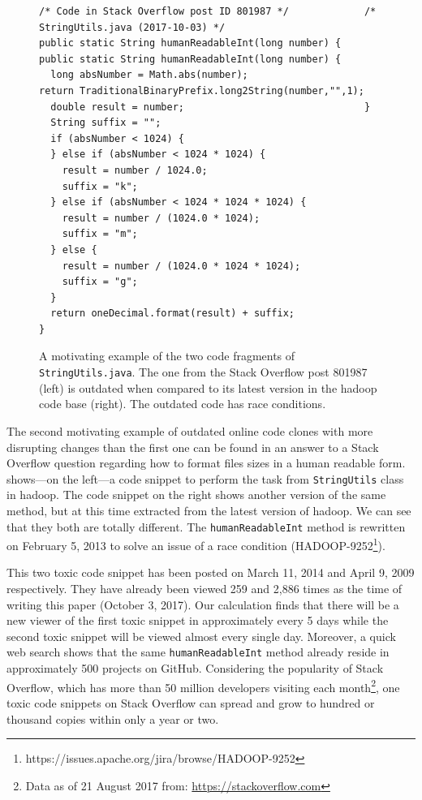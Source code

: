 \documentclass[10pt,journal,compsoc]{IEEEtran}
\begin{document}
\begin{figure}
	\begin{lstlisting}
/* Code in Stack Overflow post ID 801987 */             /* StringUtils.java (2017-10-03) */
public static String humanReadableInt(long number) {    public static String humanReadableInt(long number) {
  long absNumber = Math.abs(number);                      return TraditionalBinaryPrefix.long2String(number,"",1);
  double result = number;                               }
  String suffix = "";
  if (absNumber < 1024) {
  } else if (absNumber < 1024 * 1024) {
    result = number / 1024.0;
    suffix = "k";
  } else if (absNumber < 1024 * 1024 * 1024) {
    result = number / (1024.0 * 1024);
    suffix = "m";
  } else {
    result = number / (1024.0 * 1024 * 1024);
    suffix = "g";
  }
  return oneDecimal.format(result) + suffix;
}
	\end{lstlisting}\vspace{-2ex}
	\caption{A motivating example of the two code fragments of
		{\small\texttt{StringUtils.java}}. The one from the
		Stack Overflow post 801987 (left) is outdated when compared to
		its latest version in the \textsf{hadoop} code base
		(right). The outdated code has race conditions.}
	\label{fig:before-after_2}
\end{figure}

The second motivating example of outdated online code clones with more
disrupting changes than the first one  can be found in an answer to a Stack
Overflow question regarding how to format files sizes in a human readable form.
 shows---on the left---a code snippet to perform the
task from {\small{\texttt{StringUtils}}} class in \textsf{hadoop}. The code snippet on the
right shows another version of the same method, but at this time extracted from
the latest version of \textsf{hadoop}. We can see that
they both are totally different. The {\small{\texttt{humanReadableInt}}} method is
rewritten on February 5, 2013 to solve an issue of a race condition
(HADOOP-9252\footnote{https://issues.apache.org/jira/browse/HADOOP-9252}).

This two toxic code snippet has been posted on March 11, 2014 and April 9, 2009
respectively. They have already been viewed 259 and 2,886 times as the time of
writing this paper (October 3, 2017). Our calculation finds that there will be a
new viewer of the first toxic snippet in approximately every 5 days while the
second toxic snippet will be viewed almost every single day. Moreover, a
quick web search shows that the same {\small{\texttt{humanReadableInt}}}
method already reside in approximately 500 projects on GitHub. Considering the popularity of Stack
Overflow, which has more than 50 million developers visiting each
month\footnote{Data as of 21 August 2017 from: \url{https://stackoverflow.com}},
one toxic code snippets on Stack Overflow can spread and grow to hundred or
thousand copies within only a year or two.
\end{document}
